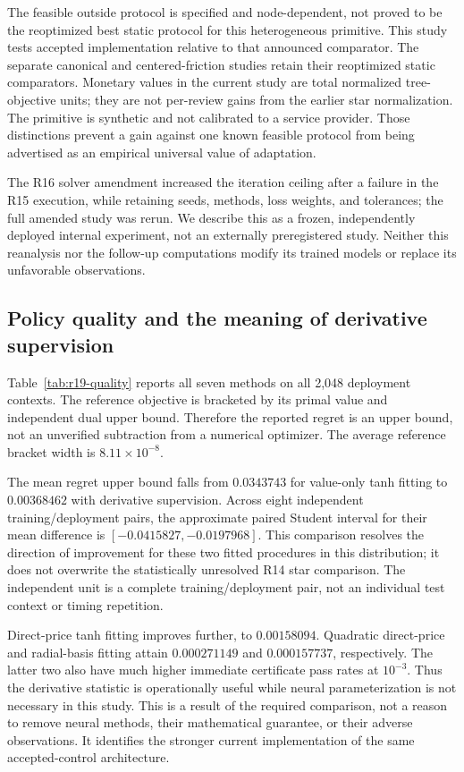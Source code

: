 The feasible outside protocol is specified and node-dependent, not proved to be the reoptimized best static protocol for this heterogeneous primitive. This study tests accepted implementation relative to that announced comparator. The separate canonical and centered-friction studies retain their reoptimized static comparators. Monetary values in the current study are total normalized tree-objective units; they are not per-review gains from the earlier star normalization. The primitive is synthetic and not calibrated to a service provider. Those distinctions prevent a gain against one known feasible protocol from being advertised as an empirical universal value of adaptation.

The R16 solver amendment increased the iteration ceiling after a failure in the R15 execution, while retaining seeds, methods, loss weights, and tolerances; the full amended study was rerun. We describe this as a frozen, independently deployed internal experiment, not an externally preregistered study. Neither this reanalysis nor the follow-up computations modify its trained models or replace its unfavorable observations.

\subsection{Policy quality and the meaning of derivative supervision}
Table~\ref{tab:r19-quality} reports all seven methods on all 2,048 deployment contexts. The reference objective is bracketed by its primal value and independent dual upper bound. Therefore the reported regret is an upper bound, not an unverified subtraction from a numerical optimizer. The average reference bracket width is $8.11\times10^{-8}$.

The mean regret upper bound falls from $0.0343743$ for value-only tanh fitting to $0.00368462$ with derivative supervision. Across eight independent training/deployment pairs, the approximate paired Student interval for their mean difference is $[-0.0415827,-0.0197968]$. This comparison resolves the direction of improvement for these two fitted procedures in this distribution; it does not overwrite the statistically unresolved R14 star comparison. The independent unit is a complete training/deployment pair, not an individual test context or timing repetition.

Direct-price tanh fitting improves further, to $0.00158094$. Quadratic direct-price and radial-basis fitting attain $0.000271149$ and $0.000157737$, respectively. The latter two also have much higher immediate certificate pass rates at $10^{-3}$. Thus the derivative statistic is operationally useful while neural parameterization is not necessary in this study. This is a result of the required comparison, not a reason to remove neural methods, their mathematical guarantee, or their adverse observations. It identifies the stronger current implementation of the same accepted-control architecture.

